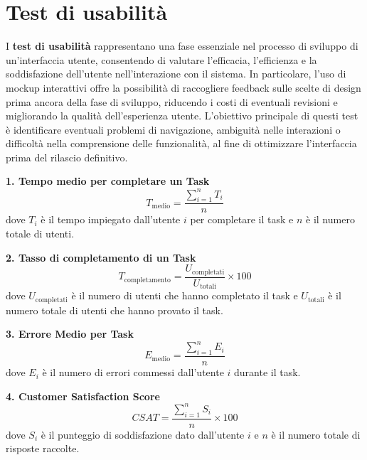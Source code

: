 \section{Test di usabilità}

I \textbf{test di usabilità} rappresentano una fase essenziale nel processo di sviluppo di un’interfaccia utente, consentendo di valutare l'efficacia, l’efficienza e la soddisfazione dell’utente nell’interazione con il sistema. In particolare, l'uso di mockup interattivi offre la possibilità di raccogliere feedback sulle scelte di design prima ancora della fase di sviluppo, riducendo i costi di eventuali revisioni e migliorando la qualità dell’esperienza utente.
\newline
L'obiettivo principale di questi test è identificare eventuali problemi di navigazione, ambiguità nelle interazioni o difficoltà nella comprensione delle funzionalità, al fine di ottimizzare l'interfaccia prima del rilascio definitivo. 

\vspace{0.5cm} %

\textbf{1. Tempo medio per completare un Task}
\begin{equation}
T_{\text{medio}} = \frac{\sum_{i=1}^{n} T_i}{n}
\end{equation}
dove \( T_i \) è il tempo impiegato dall'utente \( i \) per completare il task e \( n \) è il numero totale di utenti.

\vspace{0.5cm} %
\textbf{2. Tasso di completamento di un Task}
\begin{equation}
T_{\text{completamento}} = \frac{U_{\text{completati}}}{U_{\text{totali}}} \times 100
\end{equation}
dove \( U_{\text{completati}} \) è il numero di utenti che hanno completato il task e \( U_{\text{totali}} \) è il numero totale di utenti che hanno provato il task.

\vspace{0.5cm} %
\textbf{3. Errore Medio per Task}
\begin{equation}
E_{\text{medio}} = \frac{\sum_{i=1}^{n} E_i}{n}
\end{equation}
dove \( E_i \) è il numero di errori commessi dall'utente \( i \) durante il task.

\vspace{0.5cm} %
\textbf{4. Customer Satisfaction Score}
\begin{equation}
CSAT = \frac{\sum_{i=1}^{n} S_i}{n} \times 100
\end{equation}
dove \( S_i \) è il punteggio di soddisfazione dato dall'utente \( i \) e \( n \) è il numero totale di risposte raccolte.

